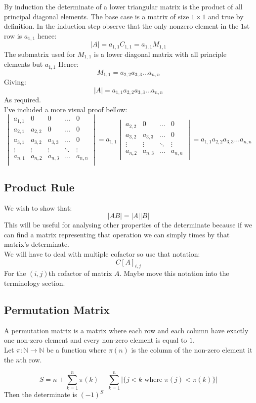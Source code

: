 By induction the determinate of a lower triangular matrix is the product of all principal diagonal elements.
The base case is a matrix of size $1\times 1$ and true by definition. 
In the induction step observe that the only nonzero element in the $1$st row is $a_{1,1}$ hence:
\[|A| = a_{1,1}C_{1,1} = a_{1,1}M_{1,1}\]
The submatrix used for $M_{1,1}$ is a lower diagonal matrix with all principle elements but $a_{1,1}$
Hence:
\[M_{1,1} = a_{2,2}a_{3,3}\dots a_{n,n}\]
Giving:
\[|A| = a_{1,1}a_{2,2}a_{3,3}\dots a_{n,n}\]
As required.
\\

I've included a more visual proof bellow:
\[\begin{vmatrix}
	a_{1,1}&0&0&\dots&0 \\
	a_{2,1}&a_{2,2}&0&\dots&0 \\
	a_{3,1}&a_{3,2}&a_{3,3}&\dots&0 \\
	\vdots&\vdots&\vdots&\ddots&\vdots \\
	a_{n,1}&a_{n,2}&a_{n,3}&\dots&a_{n,n} \\
\end{vmatrix}
=a_{1,1}
\begin{vmatrix}
	a_{2,2}&0&\dots&0 \\
	a_{3,2}&a_{3,3}&\dots&0 \\
	\vdots&\vdots&\ddots&\vdots \\
	a_{n,2}&a_{n,3}&\dots&a_{n,n} \\
\end{vmatrix}
=a_{1,1}a_{2,2}a_{3,3}\dots a_{n,n}\]

\subsection{Product Rule}
We wish to show that:
\[|AB|=|A||B|\]
This will be useful for analysing other properties of the determinate because if we can find a matrix representing that operation we can simply times by that matrix's determinate.
\\

We will have to deal with multiple cofactor so use that notation:
\[C[A]_{i,j}\]
For the $(i,j)$th cofactor of matrix $A$.
Maybe move this notation into the terminology section.

\subsection{Permutation Matrix}
A permutation matrix is a matrix where each row and each column have exactly one non-zero element and every non-zero element is equal to $1$.
\\

Let $\pi:\mathbb{N}\rightarrow\mathbb{N}$ be a function where $\pi(n)$ is the column of the non-zero element it the $n$th row.

\[S=n+\sum_{k=1}^n\pi(k)-\sum_{k=1}^{n}|\{j<k \text{ where } \pi(j)<\pi(k)\}|\]
Then the determinate is $(-1)^S$

